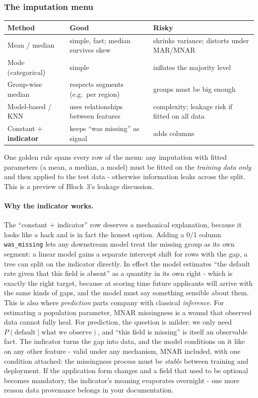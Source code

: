 \documentclass[11pt,a4paper]{article}
\begin{document}
\subsubsection{The imputation menu}
\begin{center}\small
\begin{tabular}{@{}lp{5.2cm}p{5.2cm}@{}}
\toprule
Method & Good & Risky \\
\midrule
Mean / median & simple, fast; median survives skew & shrinks variance; distorts under MAR/MNAR \\
Mode (categorical) & simple & inflates the majority level \\
Group-wise median & respects segments (e.g.\ per region) & groups must be big enough \\
Model-based / KNN & uses relationships between features & complexity; leakage risk if fitted on all data \\
Constant + \textbf{indicator} & keeps ``was missing'' as signal & adds columns \\
\bottomrule
\end{tabular}
\end{center}

One golden rule spans every row of the menu: any imputation with fitted
parameters (a mean, a median, a model) must be fitted on the \emph{training
data only} and then applied to the test data - otherwise information leaks
across the split. This is a preview of Block~3's leakage discussion.

\paragraph{Why the indicator works.} The ``constant + indicator'' row
deserves a mechanical explanation, because it looks like a hack and is in
fact the honest option. Adding a 0/1 column \texttt{was\_missing} lets any
downstream model treat the missing group as its own segment: a linear
model gains a separate intercept shift for rows with the gap, a tree can
split on the indicator directly. In effect the model estimates ``the
default rate given that this field is absent'' as a quantity in its own
right - which is exactly the right target, because at scoring time future
applicants will arrive with the same kinds of gaps, and the model must
say something sensible about them. This is also where \emph{prediction}
parts company with classical \emph{inference}. For estimating a
population parameter, MNAR missingness is a wound that observed data
cannot fully heal. For prediction, the question is milder: we only need
$P(\text{default} \mid \text{what we observe})$, and ``this field is
missing'' is itself an observable fact. The indicator turns the gap into
data, and the model conditions on it like on any other feature - valid
under any mechanism, MNAR included, with one condition attached: the
missingness process must be \emph{stable} between training and
deployment. If the application form changes and a field that used to be
optional becomes mandatory, the indicator's meaning evaporates overnight
- one more reason data provenance belongs in your documentation.
\end{document}
